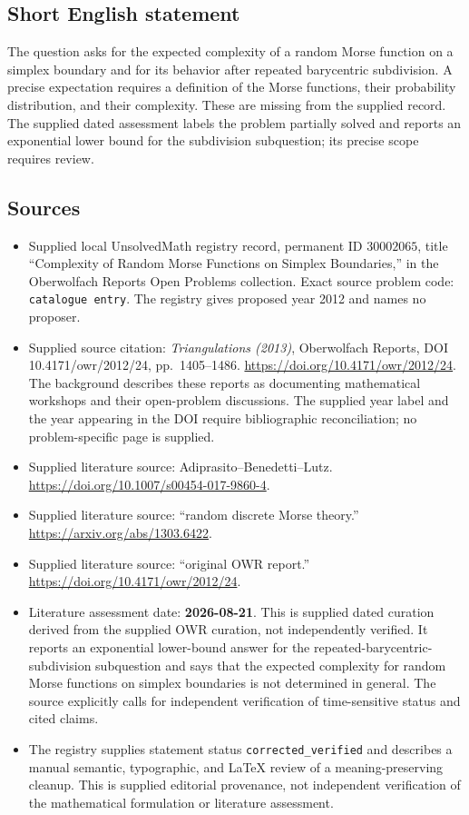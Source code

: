 \documentclass[11pt]{article}
\begin{document}
\subsection{Short English statement}
The question asks for the expected complexity of a random Morse function on a simplex boundary and for its behavior after repeated barycentric subdivision. A precise expectation requires a definition of the Morse functions, their probability distribution, and their complexity. These are missing from the supplied record. The supplied dated assessment labels the problem partially solved and reports an exponential lower bound for the subdivision subquestion; its precise scope requires review.
\subsection{Sources}
\begin{itemize}
\item Supplied local UnsolvedMath registry record, permanent ID \(30002065\), title ``Complexity of Random Morse Functions on Simplex Boundaries,'' in the Oberwolfach Reports Open Problems collection. Exact source problem code: \texttt{catalogue entry}. The registry gives proposed year 2012 and names no proposer.
\item Supplied source citation: \emph{Triangulations (2013)}, Oberwolfach Reports, DOI 10.4171/owr/2012/24, pp.~1405--1486. \url{https://doi.org/10.4171/owr/2012/24}. The background describes these reports as documenting mathematical workshops and their open-problem discussions. The supplied year label and the year appearing in the DOI require bibliographic reconciliation; no problem-specific page is supplied.
\item Supplied literature source: Adiprasito--Benedetti--Lutz. \url{https://doi.org/10.1007/s00454-017-9860-4}.
\item Supplied literature source: ``random discrete Morse theory.'' \url{https://arxiv.org/abs/1303.6422}.
\item Supplied literature source: ``original OWR report.'' \url{https://doi.org/10.4171/owr/2012/24}.
\item Literature assessment date: \textbf{2026-08-21}. This is supplied dated curation derived from the supplied OWR curation, not independently verified. It reports an exponential lower-bound answer for the repeated-barycentric-subdivision subquestion and says that the expected complexity for random Morse functions on simplex boundaries is not determined in general. The source explicitly calls for independent verification of time-sensitive status and cited claims.
\item The registry supplies statement status \texttt{corrected\_verified} and describes a manual semantic, typographic, and LaTeX review of a meaning-preserving cleanup. This is supplied editorial provenance, not independent verification of the mathematical formulation or literature assessment.
\end{itemize}
\end{document}

